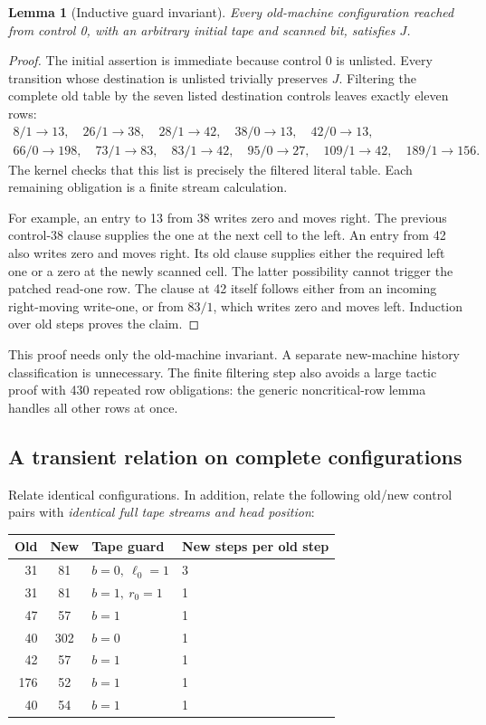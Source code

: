 \documentclass[11pt]{article}
\newtheorem{lemma}[theorem]{Lemma}
\begin{document}
\begin{lemma}[Inductive guard invariant]
Every old-machine configuration reached from control 0, with an arbitrary initial tape and scanned bit, satisfies $J$.
\end{lemma}
\begin{proof}
The initial assertion is immediate because control 0 is unlisted. Every transition whose destination is unlisted trivially preserves $J$. Filtering the complete old table by the seven listed destination controls leaves exactly eleven rows:
\[
\begin{gathered}
8/1\to13,\quad26/1\to38,\quad28/1\to42,\quad
38/0\to13,\quad42/0\to13,\\
66/0\to198,\quad73/1\to83,\quad83/1\to42,\quad
95/0\to27,\quad109/1\to42,\quad189/1\to156.
\end{gathered}
\]
The kernel checks that this list is precisely the filtered literal table. Each remaining obligation is a finite stream calculation.

For example, an entry to 13 from 38 writes zero and moves right. The previous control-38 clause supplies the one at the next cell to the left. An entry from 42 also writes zero and moves right. Its old clause supplies either the required left one or a zero at the newly scanned cell. The latter possibility cannot trigger the patched read-one row. The clause at 42 itself follows either from an incoming right-moving write-one, or from $83/1$, which writes zero and moves left. Induction over old steps proves the claim.
\end{proof}

This proof needs only the old-machine invariant. A separate new-machine history classification is unnecessary. The finite filtering step also avoids a large tactic proof with 430 repeated row obligations: the generic noncritical-row lemma handles all other rows at once.

\subsection{A transient relation on complete configurations}

Relate identical configurations. In addition, relate the following old/new control pairs with \emph{identical full tape streams and head position}:

\begin{center}
\begin{tabular}{@{}rcll@{}}
\toprule
Old & New & Tape guard & New steps per old step\\
\midrule
31 & 81 & $b=0,\ \ell_0=1$ & 3\\
31 & 81 & $b=1,\ r_0=1$ & 1\\
47 & 57 & $b=1$ & 1\\
40 & 302 & $b=0$ & 1\\
42 & 57 & $b=1$ & 1\\
176 & 52 & $b=1$ & 1\\
40 & 54 & $b=1$ & 1\\
\bottomrule
\end{tabular}
\end{center}
\end{document}
